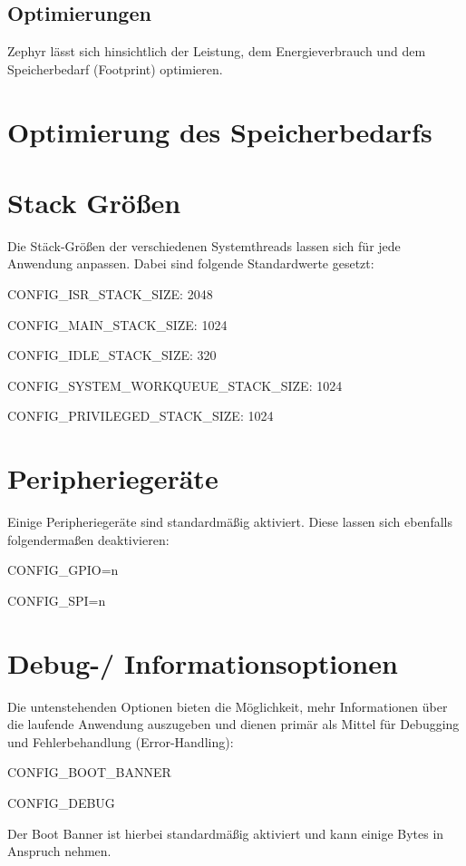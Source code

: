 \subsection{Optimierungen}

Zephyr l{\"a}sst sich hinsichtlich der Leistung, dem Energieverbrauch und dem Speicherbedarf (Footprint) optimieren.

\section{Optimierung des Speicherbedarfs}

\section{Stack Gr{\"o}{\ss}en}

Die St{\"a}ck-Gr{\"o}{\ss}en der verschiedenen Systemthreads lassen sich f{\"u}r jede Anwendung anpassen. Dabei sind folgende Standardwerte gesetzt:

CONFIG\_ISR\_STACK\_SIZE: 2048

CONFIG\_MAIN\_STACK\_SIZE: 1024

CONFIG\_IDLE\_STACK\_SIZE: 320

CONFIG\_SYSTEM\_WORKQUEUE\_STACK\_SIZE: 1024

CONFIG\_PRIVILEGED\_STACK\_SIZE: 1024

\section{Peripherieger{\"a}te}

Einige Peripherieger{\"a}te sind standardm{\"a}{\ss}ig aktiviert. Diese lassen sich ebenfalls folgenderma{\ss}en deaktivieren:

CONFIG\_GPIO=n

CONFIG\_SPI=n

\section{Debug-/ Informationsoptionen}

Die untenstehenden Optionen bieten die M{\"o}glichkeit, mehr Informationen {\"u}ber die laufende Anwendung auszugeben und dienen prim{\"a}r als Mittel f{\"u}r Debugging und Fehlerbehandlung (Error-Handling):

CONFIG\_BOOT\_BANNER

CONFIG\_DEBUG

Der Boot Banner ist hierbei standardm{\"a}{\ss}ig aktiviert und kann einige Bytes in Anspruch nehmen.

